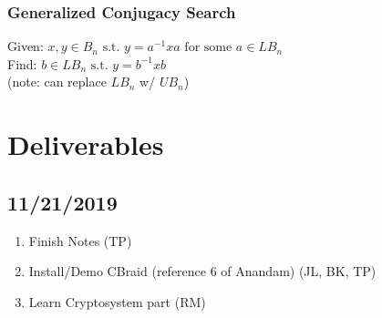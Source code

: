 \documentclass{article}
\begin{document}
	\subsubsection{Generalized Conjugacy Search}
	Given: $x,y \in B_n \text{ s.t. } y=a^{-1}xa \text{ for some } a \in LB_n$ \\
	Find: $b \in LB_n \text{ s.t. } y = b^{-1}xb$ \\
	(note: can replace $LB_n$ w/ $UB_n$)
	
	\section*{Deliverables}
	\subsection*{11/21/2019}
	\begin{enumerate}
		\item Finish Notes (TP)
		\item Install/Demo CBraid (reference 6 of Anandam) (JL, BK, TP)
		\item Learn Cryptosystem part (RM)
	\end{enumerate}
	
\end{document}
